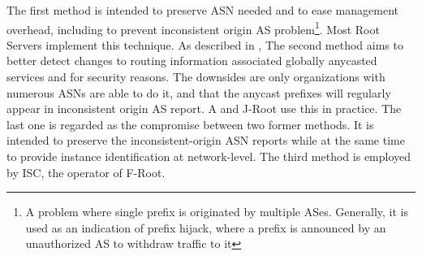 The first method is intended to preserve ASN needed and to ease management overhead, including to prevent inconsistent origin AS problem\footnote{A problem where single prefix is originated by multiple ASes. Generally, it is used as an indication of prefix hijack, where a prefix is announced by an unauthorized AS to withdraw traffic to it}. Most Root Servers implement this technique. As described in \cite{rfc6382}, The second method aims to better detect changes to routing information associated globally anycasted services and for security reasons.  
The downsides are only organizations with numerous ASNs are able to do it, and that the anycast prefixes will regularly appear in inconsistent origin AS report. A and J-Root use this in practice. The last one  is regarded as the compromise between two former methods. It is intended to preserve the inconsistent-origin ASN reports while at the same time to provide instance identification at network-level. The third method is employed by ISC, the operator of F-Root.



